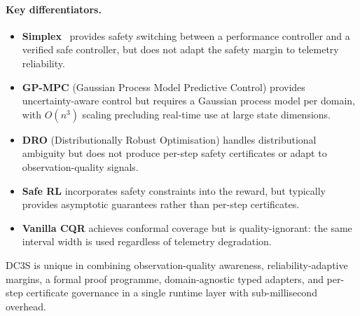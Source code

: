 \paragraph{Key differentiators.}
\begin{itemize}[nosep]
  \item \textbf{Simplex}~\cite{sha1998simplex,sha2001using} provides safety switching between a
        performance controller and a verified safe controller, but does not adapt
        the safety margin to telemetry reliability.
  \item \textbf{GP-MPC} (Gaussian Process Model Predictive Control) provides
        uncertainty-aware control but requires a Gaussian process model per domain,
        with $O(n^3)$ scaling precluding real-time use at large state dimensions.
  \item \textbf{DRO} (Distributionally Robust Optimisation) handles distributional
        ambiguity but does not produce per-step safety certificates or adapt to
        observation-quality signals.
  \item \textbf{Safe RL} incorporates safety constraints into the reward, but
        typically provides asymptotic guarantees rather than per-step certificates.
  \item \textbf{Vanilla CQR} achieves conformal coverage but is quality-ignorant:
        the same interval width is used regardless of telemetry degradation.
\end{itemize}

DC3S is unique in combining observation-quality awareness, reliability-adaptive margins,
a formal proof programme, domain-agnostic typed adapters, and per-step certificate
governance in a single runtime layer with sub-millisecond overhead.
